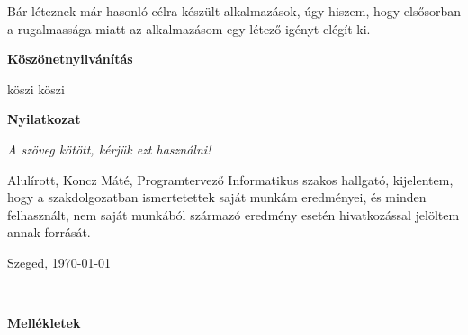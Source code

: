 \documentclass[a4paper,12pt]{report}
\theoremstyle{definition}
\theoremstyle{remark}
\begin{document}
Bár léteznek már hasonló célra készült alkalmazások, úgy hiszem, hogy elsősorban a rugalmassága miatt az alkalmazásom egy létező igényt elégít ki.

\newpage


 

\newpage
{\Huge \bf Köszönetnyilvánítás}


\vspace{2 cm}

köszi köszi

\newpage
{\Huge \bf Nyilatkozat}


\vspace{2 cm}

{\it A szöveg kötött, kérjük ezt használni!}

Alulírott, Koncz Máté, Programtervező Informatikus szakos hallgató, kijelentem, hogy a szakdolgozatban ismertetettek saját munkám eredményei, és minden felhasznált, nem saját munkából származó eredmény esetén hivatkozással jelöltem annak forrását. 


\begin{flushleft}
\vspace*{1cm}
Szeged, \today
\end{flushleft}

\begin{flushright}
 \vspace*{1cm}
 \makebox[7cm]{\rule{6cm}{.4pt}}\\
\end{flushright}

\pagebreak

\newpage
{\Huge \bf Mellékletek}

\begin{center}



\end{center}



\vspace{2 cm}
\end{document}
